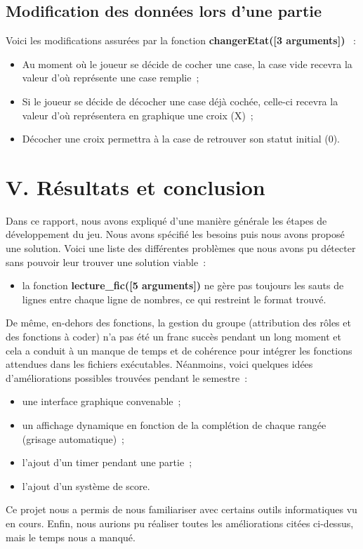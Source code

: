 \documentclass[a4paper,11pt]{article}
\begin{document}
\subsection{Modification des données lors d'une partie}
Voici les modifications assurées par la fonction \og \textbf{changerEtat([3 arguments])} \fg{}~:\medbreak
\begin{itemize}[label=$\square$]
	\item Au moment où le joueur se décide de cocher une case, la case vide recevra la valeur  \fg{} d'où  \fg{} représente une case remplie~;
	\item Si le joueur se décide de décocher une case déjà cochée, celle-ci recevra la valeur  \fg{} d'où  \fg{} représentera en graphique une croix (X)~;
	\item Décocher une croix permettra à la case de retrouver son statut initial (0).
\end{itemize}
\newpage
\section*{\LARGE V. \hspace*{0.05cm} Résultats et conclusion}
\label{section*:resultats_conclusion}
Dans ce rapport, nous avons expliqué d’une manière générale les étapes de développement du jeu. Nous avons spécifié les besoins puis nous avons proposé une solution.\bigbreak
Voici une liste des différentes problèmes que nous avons pu détecter sans pouvoir leur trouver une solution viable~:\medbreak
\begin{itemize}[label=$\blacksquare$]
	\item la fonction \textbf{lecture\_fic([5 arguments])} ne gère pas toujours les sauts de lignes entre chaque ligne de nombres, ce qui restreint le format trouvé.
\end{itemize}\bigbreak
De même, en-dehors des fonctions, la gestion du groupe (attribution des rôles et des fonctions à coder) n'a pas été un franc succès pendant un long moment et cela a conduit à un manque de temps et de cohérence pour intégrer les fonctions attendues dans les fichiers exécutables. Néanmoins, voici quelques idées d'améliorations possibles trouvées pendant le semestre~:\medbreak
\begin{itemize}[label=$\square$]
	\item une interface graphique convenable~;
	\item un affichage dynamique en fonction de la complétion de chaque rangée (grisage automatique)~;
	\item l'ajout d'un timer pendant une partie~;
	\item l'ajout d'un système de score.
\end{itemize}\bigbreak
Ce projet nous a permis de nous familiariser avec certains outils informatiques vu en cours. Enfin, nous aurions pu réaliser toutes les améliorations citées ci-dessus, mais le temps nous a manqué.
\end{document}
